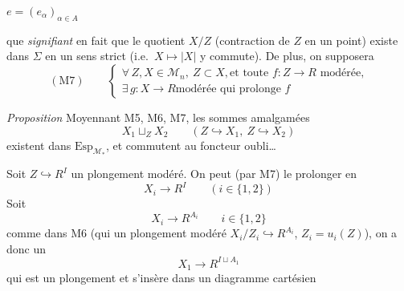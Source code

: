 \documentclass[11pt,a4paper]{article}
\begin{document}
\struck{(\ill{})}


$e = (e_\alpha)_{\alpha \in A}$


 que \emph{signifiant} en fait que le quotient $X/Z$
(contraction de $Z$ en un point) existe dans $\Sigma$ en un sens strict
(i.e.\ $X \mapsto |X|$ y commute). De plus, on supposera
\[ (\mathrm{M}7) \qquad \begin{cases} \forall\, Z, X \in \mathcal{M}_n,\ Z \subset X, \text{
et toute } f : Z \to R \text{ modérée,} \\ \exists\, g : X \to R \text{
modérée qui prolonge } f \end{cases} \]

\emph{Proposition} Moyennant M5, M6, M7, les sommes amalgamées
\[ X_1 \sqcup_Z X_2 \qquad (Z \hookrightarrow X_1,\ Z \hookrightarrow X_2) \]
existent dans $\mathrm{Esp}_{\mathcal{M}_*}$, et commutent au foncteur
oubli\ldots
{}

Soit $Z \hookrightarrow R^I$ un plongement modéré. On peut (par M7) le
prolonger en
\[ X_i \longrightarrow R^I \qquad (i \in \lbrace 1, 2 \rbrace) \]
Soit
\[ X_i \longrightarrow R^{A_i} \qquad i \in \lbrace 1, 2 \rbrace \]
comme dans M6 (qui  un \struck{\ill{}} plongement modéré
$X_i / Z_i \hookrightarrow R^{A_i}$, $Z_i = u_i(Z)$),  on a donc
un
\[ X_1 \to R^{I \sqcup A_1} \]
qui est un plongement et s'insère dans un diagramme cartésien

\end{document}
